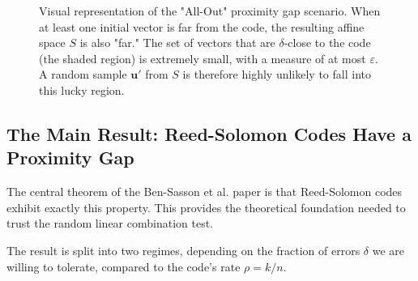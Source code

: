 \documentclass{article}
\begin{document}
\begin{figure}[h!]
{}
\caption{Visual representation of the "All-Out" proximity gap scenario. When at least one initial vector is far from the code, the resulting affine space $S$ is also "far." The set of vectors that are $\delta$-close to the code (the shaded region) is extremely small, with a measure of at most $\varepsilon$. A random sample $\mathbf{u}'$ from $S$ is therefore highly unlikely to fall into this lucky region.}
\label{fig:proximity_gap_malicious}
\end{figure}



\subsection{The Main Result: Reed-Solomon Codes Have a Proximity Gap}
The central theorem of the Ben-Sasson et al. paper\cite{ben2023proximity} is that Reed-Solomon codes exhibit exactly this property. This provides the theoretical foundation needed to trust the random linear combination test.

The result is split into two regimes, depending on the fraction of errors $\delta$ we are willing to tolerate, compared to the code's rate $\rho = k/n$.
\end{document}
